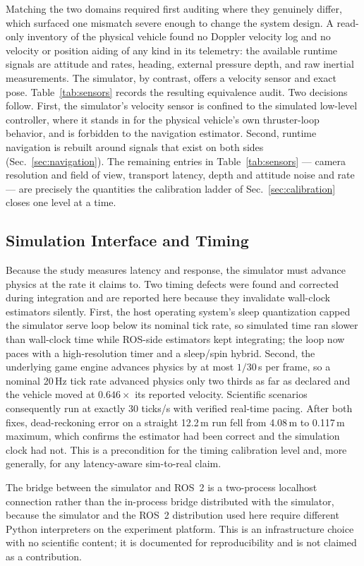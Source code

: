Matching the two domains required first auditing where they genuinely differ,
which surfaced one mismatch severe enough to change the system design. A
read-only inventory of the physical vehicle found no Doppler velocity log and
no velocity or position aiding of any kind in its telemetry: the available
runtime signals are attitude and rates, heading, external pressure depth, and
raw inertial measurements. The simulator, by contrast, offers a velocity
sensor and exact pose. Table~\ref{tab:sensors} records the resulting
equivalence audit. Two decisions follow. First, the simulator's velocity
sensor is confined to the simulated low-level controller, where it stands in
for the physical vehicle's own thruster-loop behavior, and is forbidden to
the navigation estimator. Second, runtime navigation is rebuilt around
signals that exist on both sides (Sec.~\ref{sec:navigation}). The remaining
entries in Table~\ref{tab:sensors} --- camera resolution and field of view,
transport latency, depth and attitude noise and rate --- are precisely the
quantities the calibration ladder of Sec.~\ref{sec:calibration} closes one
level at a time.



\subsection{Simulation Interface and Timing}

Because the study measures latency and response, the simulator must advance
physics at the rate it claims to. Two timing defects were found and corrected
during integration and are reported here because they invalidate wall-clock
estimators silently. First, the host operating system's sleep quantization
capped the simulator serve loop below its nominal tick rate, so simulated
time ran slower than wall-clock time while ROS-side estimators kept
integrating; the loop now paces with a high-resolution timer and a
sleep/spin hybrid. Second, the underlying game engine advances physics by at
most $1/30$\,s per frame, so a nominal 20\,Hz tick rate advanced physics only
two thirds as far as declared and the vehicle moved at $0.646\times$ its
reported velocity. Scientific scenarios consequently run at exactly 30
ticks/s with verified real-time pacing. After both fixes, dead-reckoning
error on a straight 12.2\,m run fell from 4.08\,m to 0.117\,m maximum, which
confirms the estimator had been correct and the simulation clock had not.
This is a precondition for the timing calibration level \STWO{} and, more
generally, for any latency-aware sim-to-real claim.

The bridge between the simulator and ROS~2 is a two-process localhost
connection rather than the in-process bridge distributed with the
simulator, because the simulator and the ROS~2 distribution used here require
different Python interpreters on the experiment platform. This is an
infrastructure choice with no scientific content; it is documented for
reproducibility and is not claimed as a contribution.
